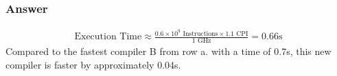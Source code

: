 \documentclass[12pt]{article}
\begin{document}
\begin{itemize}
\subsubsection*{Answer}
\begin{align*}
\text{Execution Time} \approx \frac{0.6 \times 10^9\text{ Instructions} \times 1.1\text{ CPI}}{1\text{ GHz}} = 0.66\text{s}
\end{align*}
Compared to the fastest compiler B from row a. with a time of 0.7s, this new compiler is faster by approximately 0.04s.

\end{itemize}
\end{document}
